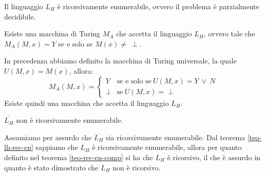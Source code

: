 \begin{teorema} \label{teo-lh-rec-en}
    Il linguaggio $L_H$ è ricorsivamente enumerabile, ovvero il problema è
    parzialmente decidibile.
\end{teorema}
\begin{dimostrazione}
    Esiste una macchina di Turing $M_A$ che accetta il linguaggio $L_H$, ovvero
    tale che $M_A(M, x) = Y$ se e solo se $M(x) \neq \ \perp$.

    In precedenza abbiamo definito la macchina di Turing universale, la quale
    $U(M, x) = M(x)$, allora:
    \begin{equation}
        M_A(M, x) = \begin{cases}
            Y     & \text{se e solo se} \ U(M, x) = Y \ \lor \ N \\
            \perp & \text{se} \ U(M, x) = \perp
        \end{cases}
    \end{equation}
    Esiste quindi una macchina che accetta il linguaggio $L_H$.
\end{dimostrazione}
\begin{teorema}
    $\overline{L_H}$ non è ricorsivamente enumerabile.
\end{teorema}
\begin{dimostrazione} 
    Assumiamo per assurdo che $\overline{L_H}$ sia ricorsivamente enumerabile.
    Dal teorema \ref{teo-lh-rec-en} sappiamo che $L_H$ è ricorsivamente
    enumerabile, allora per quanto definito nel teorema \ref{teo-rec-en-comp} si
    ha che $L_H$ è ricorsivo, il che è assurdo in quanto è stato dimostrato che
    $L_H$ non è ricorsivo.
\end{dimostrazione}

